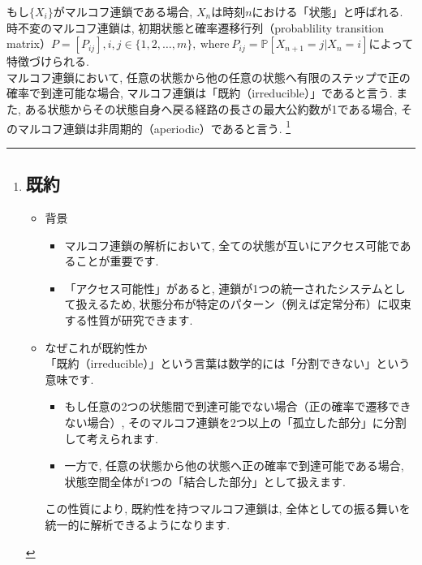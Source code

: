 \documentclass[a4j]{jsarticle}
\begin{document}
もし$\{X_i\}$がマルコフ連鎖である場合, $X_n$は時刻$n$における「状態」と呼ばれる. 時不変のマルコフ連鎖は, 初期状態と確率遷移行列（probablility transition matrix）$P = [P_{ij}], i,j \in \{1, 2, \ldots, m\}, \: \mbox{where} \: P_{ij} = \mathbb{P}[X_{n+1} = j | X_n = i]$によって特徴づけられる.\\

 マルコフ連鎖において, 任意の状態から他の任意の状態へ有限のステップで正の確率で到達可能な場合, マルコフ連鎖は「既約（irreducible）」であると言う. また, ある状態からその状態自身へ戻る経路の長さの最大公約数が1である場合, そのマルコフ連鎖は非周期的（aperiodic）であると言う.
\footnote{
	\subsection*{既約}
	\begin{itemize}
		\item 背景
		      \begin{itemize}
			      \item マルコフ連鎖の解析において, 全ての状態が互いにアクセス可能であることが重要です.
			      \item「アクセス可能性」があると, 連鎖が1つの統一されたシステムとして扱えるため, 状態分布が特定のパターン（例えば定常分布）に収束する性質が研究できます.
		      \end{itemize}
		\item なぜこれが既約性か\\
		      「既約（irreducible）」という言葉は数学的には「分割できない」という意味です.
		      \begin{itemize}
			      \item もし任意の2つの状態間で到達可能でない場合（正の確率で遷移できない場合）, そのマルコフ連鎖を2つ以上の「孤立した部分」に分割して考えられます.
			      \item 一方で, 任意の状態から他の状態へ正の確率で到達可能である場合, 状態空間全体が1つの「結合した部分」として扱えます.
		      \end{itemize}
		      この性質により, 既約性を持つマルコフ連鎖は, 全体としての振る舞いを統一的に解析できるようになります.
	\end{itemize}
}
\end{document}
